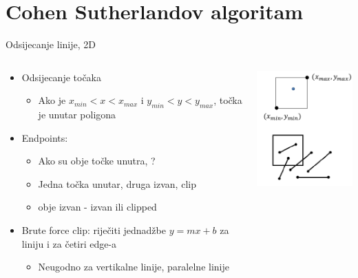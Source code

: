 \documentclass[9pt]{beamer}
\begin{document}
\section{Cohen Sutherlandov algoritam}
\begin{frame}{Odsijecanje linije, 2D}
	\begin{columns}[t]
		\begin{column}{0.6\textwidth}
			\begin{itemize}
				\item Odsijecanje točaka
				\begin{itemize}
					\item Ako je $x_{min} < x < x_{max}$ i $y_{min} < y < y_{max}$, točka je unutar poligona
				\end{itemize}
				\item Endpoints:
				\begin{itemize}
					\item Ako su obje točke unutra, ?
					\item Jedna točka unutar, druga izvan, clip
					\item obje izvan - izvan ili clipped
				\end{itemize}
				\item Brute force clip: riječiti jednadžbe $y = mx+b$ za liniju i za četiri edge-a
				\begin{itemize}
					\item Neugodno za vertikalne linije, paralelne linije
				\end{itemize}
			\end{itemize}
		\end{column}
		\begin{column}{0.4\textwidth}
			\begin{center}
				\includegraphics[width=5cm]{slike/line_clip_2d.png}
			\end{center}
		\end{column}
	\end{columns}
\end{frame}
\end{document}
